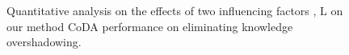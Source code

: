 \begin{figure}[!t]
\centering
{}
\caption{Quantitative analysis on the effects of two influencing factors , $\text{L}$ on our method CoDA performance on eliminating knowledge overshadowing.}
\label{fig:quantitative_analysis}
\vspace{-2mm}
\end{figure}